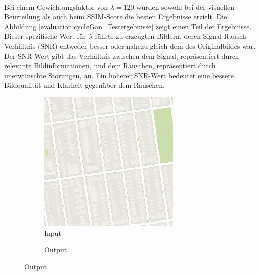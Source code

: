 \\\newline
Bei einem Gewichtungsfaktor von $\lambda=120$ wurden sowohl bei der visuellen Beurteilung als auch beim SSIM-Score die besten Ergebnisse erzielt.
Die Abbildung \ref{evaluation:cycleGan_Testergebnisse} zeigt einen Teil der Ergebnisse.
Dieser spezifische Wert für $\lambda$ führte zu erzeugten Bildern, deren Signal-Rausch-Verhältnis (SNR) entweder besser oder nahezu gleich dem des Originalbildes war. Der SNR-Wert gibt das Verhältnis zwischen dem Signal, repräsentiert durch relevante Bildinformationen, und dem Rauschen, repräsentiert durch unerwünschte Störungen, an. Ein höherer SNR-Wert bedeutet eine bessere Bildqualität und Klarheit gegenüber dem Rauschen.

\begin{figure}[ht]
  \begin{subfigure}[t]{.14\textwidth}
    \centering
    \caption*{Input}
    \includegraphics[width=\linewidth]{images/cycleGanResults/Maps19_Or_Ld120_E100_Lr0002.jpg}
  \end{subfigure}
  \begin{subfigure}[t]{.14\textwidth}
    \centering
    \caption*{Output}

\end{subfigure}
\end{figure}
